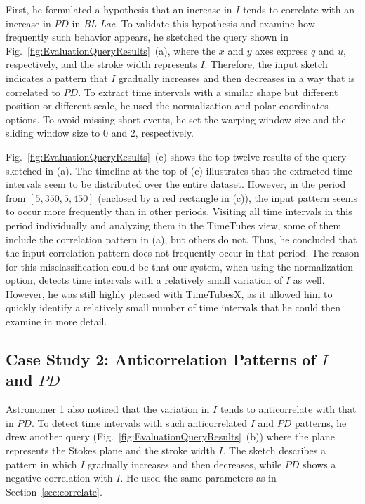 First, he formulated a hypothesis that an increase in $I$ tends to correlate with an increase in $PD$ in \emph{BL Lac}.
To validate this hypothesis and examine how frequently such behavior appears, he sketched the query shown in Fig.~\ref{fig:EvaluationQueryResults}~(a), 
where the $x$ and $y$ axes express $q$ and $u$, respectively, 
and the stroke width represents $I$.
Therefore, the input sketch indicates a pattern 
that $I$ gradually increases and then decreases in a way that is correlated to $PD$.
To extract time intervals with a similar shape but different position or different scale, he used the normalization and polar coordinates options. 
To avoid missing short events, he set the warping window size and the sliding window size to 0 and 2, respectively.

Fig.~\ref{fig:EvaluationQueryResults}~(c) shows the top twelve results of the query sketched in (a).
The timeline at the top of (c) illustrates 
that the extracted time intervals seem to be distributed over the entire dataset.
However, in the period from $[5{,}350, 5{,}450]$ (enclosed by a red rectangle in (c)), 
the input pattern seems to occur more frequently than in other periods.
Visiting all time intervals in this period individually and analyzing them in the TimeTubes view,
some of them include the correlation pattern in (a),
but others do not.
Thus, he concluded that the input correlation pattern does not frequently occur in that period.
The reason for this misclassification could be that our system, when using the normalization option, detects time intervals with a relatively small variation of $I$ as well.
However, he was still highly pleased with TimeTubesX, as it allowed him to quickly identify a relatively small number of time intervals that he could then examine in more detail.

\subsection{Case Study 2: Anticorrelation Patterns of $I$ and $PD$}\label{sec:anticorrelate}
Astronomer 1 also noticed that the variation in $I$ tends to anticorrelate with that in $PD$.
To detect time intervals with such anticorrelated $I$ and $PD$ patterns, he drew another query (Fig.~\ref{fig:EvaluationQueryResults}~(b))
where the plane represents the Stokes plane and the stroke width $I$.
The sketch describes a pattern in which $I$ gradually increases and then decreases, while $PD$ shows a negative correlation with $I$. 
He used the same parameters as in Section~\ref{sec:correlate}.

